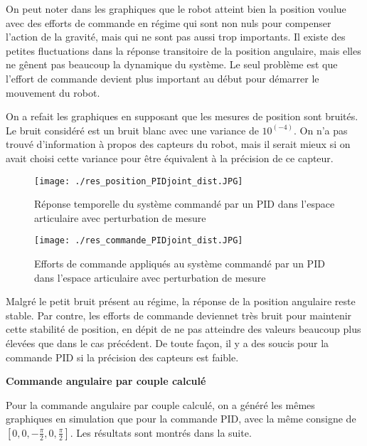 On peut noter dans les graphiques que le robot atteint bien la position voulue avec des efforts de commande en régime qui sont non nuls pour compenser l'action de la gravité, mais qui ne sont pas aussi trop importants. Il existe des petites fluctuations dans la réponse transitoire de la position angulaire, mais elles ne gênent pas beaucoup la dynamique du système. Le seul problème est que l'effort de commande devient plus important au début pour démarrer le mouvement du robot.

On a refait les graphiques en supposant que les mesures de position sont bruités. Le bruit considéré est un bruit blanc avec une variance de $ 10^(-4) $. On n'a pas trouvé d'information à propos des capteurs du robot, mais il serait mieux si on avait choisi cette variance pour être équivalent à la précision de ce capteur.

\begin{figure}[H]
	\begin{center}	
		\captionsetup{justification=centering,margin=1cm}
		\texttt{[image: ./res\_position\_PIDjoint\_dist.JPG]}
		\caption{Réponse temporelle du système commandé par un PID dans l'espace articulaire avec perturbation de mesure}
		\label{fig:PID_joint_space_response_dist}
	\end{center}
\end{figure}

\begin{figure}[H]
	\begin{center}
		\captionsetup{justification=centering,margin=1cm}	
		\texttt{[image: ./res\_commande\_PIDjoint\_dist.JPG]}
		\caption{Efforts de commande appliqués au système commandé par un PID dans l'espace articulaire avec perturbation de mesure}
		\label{fig:PIDjointcontgraphdist}
	\end{center}
\end{figure}

Malgré le petit bruit présent au régime, la réponse de la position angulaire reste stable. Par contre, les efforts de commande deviennet très bruit pour maintenir cette stabilité de position, en dépit de ne pas atteindre des valeurs beaucoup plus élevées que dans le cas précédent. De toute façon, il y a des soucis pour la commande PID si la précision des capteurs est faible. 
\newline

\textbf{Commande angulaire par couple calculé}
\newline

Pour la commande angulaire par couple calculé, on a généré les mêmes graphiques en simulation que pour la commande PID, avec la même consigne de $ \left[0, 0, -\frac{\pi}{2}, 0, \frac{\pi}{2} \right] $. Les résultats sont montrés dans la suite.

